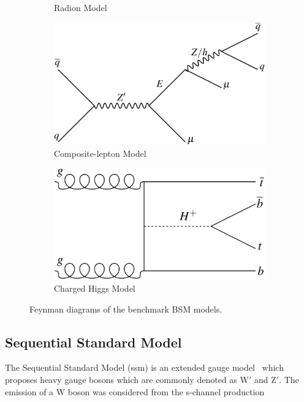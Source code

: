 \begin{figure}[h]
\begin{subfigure}[h]{0.4\linewidth}
    \caption{Radion Model}
    \end{subfigure}
    \hfill
    \begin{subfigure}[h]{0.4\linewidth}
    \includegraphics[scale=0.06]{figs/ch6/feynman/fig_01d.png}%
    \caption{Composite-lepton Model}
    \end{subfigure}
    \hfill
    \begin{subfigure}[h]{0.4\linewidth}
    \includegraphics[scale=0.16]{figs/ch6/feynman/fig_01e.png}%
    \caption{Charged Higgs Model}
    \end{subfigure}
    \hfill
    \caption{ Feynman diagrams of the benchmark BSM models.}
\label{fig:bsm-feynman}
\end{figure}

\subsection{Sequential Standard Model}

The Sequential Standard Model (\gls{ssm}) is an extended gauge model~\cite{ssm} which proposes heavy gauge bosons which are commonly denoted as $\textrm{W}'$ and $\textrm{Z}'$. 
The emission of a $\textrm{W}$ boson was considered from the s-channel production

